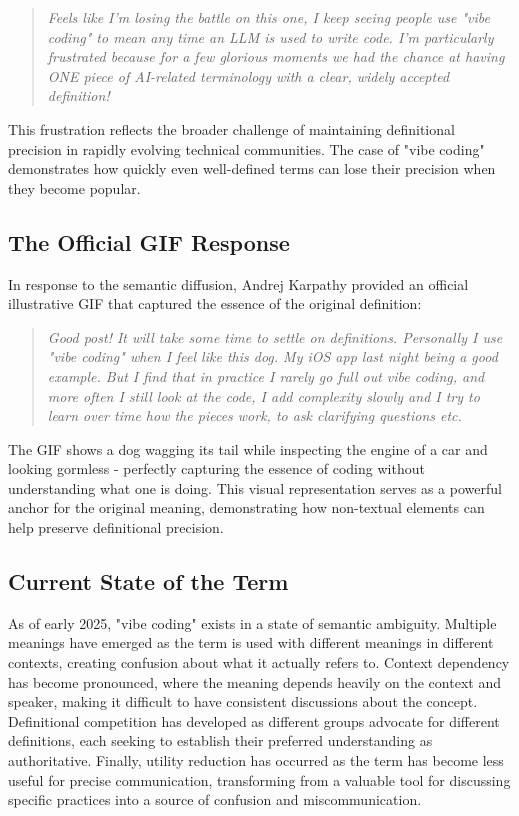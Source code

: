 \documentclass[11pt]{article}
\begin{document}
\begin{quote}
\emph{Feels like I'm losing the battle on this one, I keep seeing people use "vibe coding" to mean any time an LLM is used to write code. I'm particularly frustrated because for a few glorious moments we had the chance at having ONE piece of AI-related terminology with a clear, widely accepted definition!}
\end{quote}

This frustration reflects the broader challenge of maintaining definitional precision in rapidly evolving technical communities. The case of "vibe coding" demonstrates how quickly even well-defined terms can lose their precision when they become popular.

\subsection{The Official GIF Response}

In response to the semantic diffusion, Andrej Karpathy provided an official illustrative GIF that captured the essence of the original definition:

\begin{quote}
\emph{Good post! It will take some time to settle on definitions. Personally I use "vibe coding" when I feel like this dog. My iOS app last night being a good example. But I find that in practice I rarely go full out vibe coding, and more often I still look at the code, I add complexity slowly and I try to learn over time how the pieces work, to ask clarifying questions etc.}
\end{quote}

The GIF shows a dog wagging its tail while inspecting the engine of a car and looking gormless - perfectly capturing the essence of coding without understanding what one is doing. This visual representation serves as a powerful anchor for the original meaning, demonstrating how non-textual elements can help preserve definitional precision.

\subsection{Current State of the Term}

As of early 2025, "vibe coding" exists in a state of semantic ambiguity. Multiple meanings have emerged as the term is used with different meanings in different contexts, creating confusion about what it actually refers to. Context dependency has become pronounced, where the meaning depends heavily on the context and speaker, making it difficult to have consistent discussions about the concept. Definitional competition has developed as different groups advocate for different definitions, each seeking to establish their preferred understanding as authoritative. Finally, utility reduction has occurred as the term has become less useful for precise communication, transforming from a valuable tool for discussing specific practices into a source of confusion and miscommunication.
\end{document}

